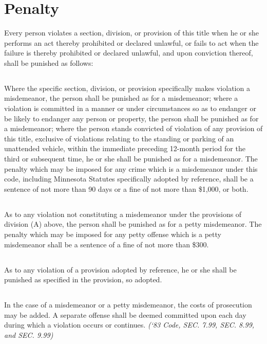 \setcounter{section}{98}
\section{Penalty}
Every person violates a section, division, or provision of this title when he or she performs an act thereby prohibited or declared unlawful, or fails to act when the failure is thereby prohibited or declared unlawful, and upon conviction thereof, shall be punished as follows:
\subsection{}
Where the specific section, division, or provision specifically makes violation a misdemeanor, the person shall be punished as for a misdemeanor; where a violation is committed in a manner or under circumstances so as to endanger or be likely to endanger any person or property, the person shall be punished as for a misdemeanor; where the person stands convicted of violation of any provision of this title, exclusive of violations relating to the standing or parking of an unattended vehicle, within the immediate preceding 12-month period for the third or subsequent time, he or she shall be punished as for a misdemeanor.  The penalty which may be imposed for any crime which is a misdemeanor under this code, including Minnesota Statutes specifically adopted by reference, shall be a sentence of not more than 90 days or a fine of not more than \$1,000, or both.
\subsection{}
As to any violation not constituting a misdemeanor under the provisions of division (A) above,  the person shall be punished as for a petty misdemeanor.  The penalty which may be imposed for any petty offense which is a petty misdemeanor shall be a sentence of a fine of not more than \$300.
\subsection{}
As to any violation of a provision adopted by reference, he or she shall be punished as specified in the provision, so adopted.
\subsection{}
In the case of a misdemeanor or a petty misdemeanor, the costs of prosecution may be added.  A separate offense shall be deemed committed upon each day during which a violation occurs or continues.\newline
\emph{(‘83 Code, SEC. 7.99, SEC. 8.99, and SEC. 9.99)}

%
